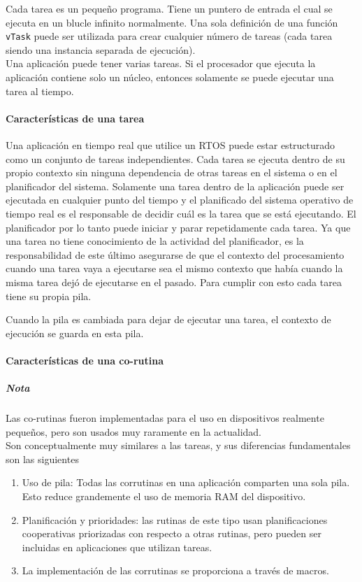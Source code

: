     Cada tarea es un pequeño programa. Tiene un puntero de entrada el cual se ejecuta en un blucle infinito normalmente. Una sola definición de una función \texttt{vTask} puede ser utilizada para crear cualquier número de tareas (cada tarea siendo una instancia separada de ejecución). \\
    
    Una aplicación puede tener varias tareas. Si el procesador que ejecuta la aplicación contiene solo un núcleo, entonces solamente se puede ejecutar una tarea al tiempo. 
    
    \paragraph{Características de una tarea}
    
    
    Una aplicación en tiempo real que utilice un RTOS puede estar estructurado como un conjunto de tareas independientes. Cada tarea se ejecuta dentro de su propio contexto sin ninguna dependencia de otras tareas en el sistema o en el planificador del sistema. Solamente una tarea dentro de la aplicación puede ser ejecutada en cualquier punto del tiempo y el planificado del sistema operativo de tiempo real es el responsable de decidir cuál es la tarea que se está ejecutando. El planificador por lo tanto puede iniciar y parar repetidamente cada tarea. Ya que una tarea no tiene conocimiento de la actividad del planificador, es la responsabilidad de este último asegurarse de que el contexto del procesamiento cuando una tarea vaya a ejecutarse sea el mismo contexto que había cuando la misma tarea dejó de ejecutarse en el pasado. Para cumplir con esto cada tarea tiene su propia pila.
    
    Cuando la pila es cambiada para dejar de ejecutar una tarea, el contexto de ejecución se guarda en esta pila.
    
    \paragraph{Características de una co-rutina}
    
    \subparagraph{Nota} Las co-rutinas fueron implementadas para el uso en dispositivos realmente pequeños, pero son usados muy raramente en la actualidad. \\
    
    Son conceptualmente muy similares a las tareas, y sus diferencias fundamentales son las siguientes
    
    \begin{enumerate}
        \item Uso de pila: Todas las corrutinas en una aplicación comparten una sola pila. Esto reduce grandemente el uso de memoria RAM del dispositivo.
        \item Planificación y prioridades: las rutinas de este tipo usan planificaciones cooperativas priorizadas con respecto a otras rutinas, pero pueden ser incluidas en aplicaciones que utilizan tareas. 
        \item La implementación de las corrutinas se proporciona a través de macros. 
    \end{enumerate}
    
